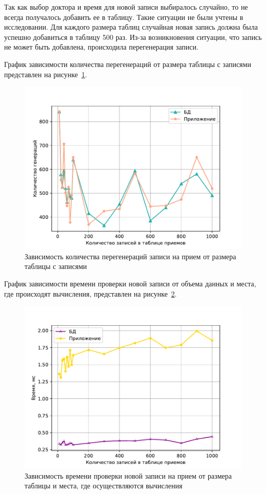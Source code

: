 Так как выбор доктора и время для новой записи выбиралось случайно, то не всегда получалось добавить ее в таблицу. Такие ситуации не были учтены в исследовании. Для каждого размера таблиц случайная новая запись должна была успешно добавиться в таблицу 500 раз. Из-за возникновения ситуации, что запись не может быть добавлена, происходила перегенерация записи.

График зависимости количества перегенераций от размера таблицы с записями представлен на рисунке~\ref{errors}.
\begin{figure}[!h]
	\centering
	\includegraphics[width=160mm]{image/errors}
	\caption{Зависимость количества перегенераций записи на прием от размера таблицы с записями}
	\label{errors}
\end{figure}

\newpage
График зависимости времени проверки новой записи от объема данных и места, где происходят вычисления, представлен на рисунке~\ref{graph}.
\begin{figure}[!h]
	\centering
	\includegraphics[width=160mm]{image/resultGraph}
	\caption{Зависимость времени проверки новой записи на прием от размера таблицы и места, где осуществляются вычисления}
	\label{graph}
\end{figure}

